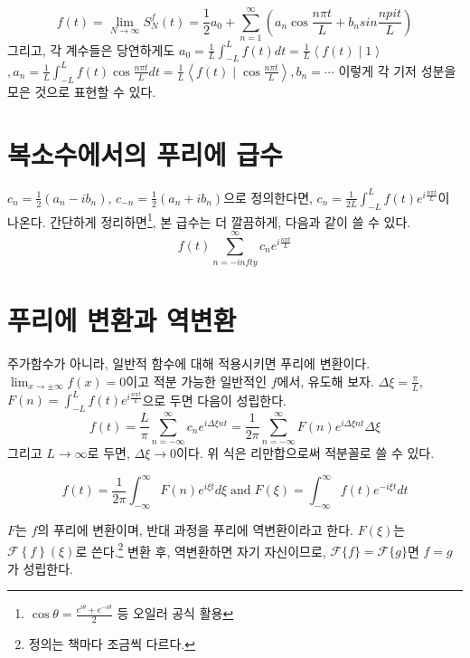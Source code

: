 \documentclass[article, oneside]{oblivoir}
\begin{document}
\begin{equation}
    f(t) = \lim_{N \to \infty} S_N^f (t) = \frac{1}{2} a_0 + \sum_{n=1}^{\infty} \left( a_n \cos \frac{n \pi t}{L} + b_n sin \frac{n pi t}{L}\right)
\end{equation}
그리고, 각 계수들은 당연하게도
$a_0 = \frac{1}{L} \int_{-L}^{L} f(t)dt
= \frac{1}{L} \left\langle f(t) \mid 1\right\rangle$$
, a_n = \frac{1}{L} \int_{-L}^{L} f(t) \cos\frac{n \pi t}{L}dt 
=\frac{1}{L} \left\langle f(t) \mid \cos\frac{n \pi t}{L}\right\rangle, b_n = \cdots$ 이렇게 각 기저 성분을 모은 것으로 표현할 수 있다.

\section{복소수에서의 푸리에 급수}
$c_n = \frac{1}{2}\left(a_n - ib_n\right)$, $c_{-n} = \frac{1}{2}\left(a_n + ib_n\right)$으로 정의한다면, $c_n = \frac{1}{2L}\int_{-L}^{L} f(t)e^{i\frac{n \pi t}{L}}$이 나온다. 간단하게 정리하면\footnote{$\cos \theta = \frac{e^{i \theta} + e^{-i \theta}}{2}$ 등 오일러 공식 활용}, 본 급수는 더 깔끔하게, 다음과 같이 쓸 수 있다.
\begin{equation}
    f(t) \sum_{n=-infty}^{\infty} c_n e^{i \frac{n \pi t}{L}}
\end{equation}

\section{푸리에 변환과 역변환}

주가함수가 아니라, 일반적 함수에 대해 적용시키면 푸리에 변환이다. $\lim_{x \to \pm \infty}f(x)=0$이고 적분 가능한 일반적인 $f$에서, 유도해 보자.
$\Delta \xi = \frac{\pi}{L}$, $F(n) = \int_{-L}^{L} f(t)e^{i\frac{n \pi t}{L}}$으로 두면 다음이 성립한다. 
$$f(t) = \frac{L}{\pi} \sum_{n=-\infty}^{\infty} c_n e^{i \Delta \xi n t} = \frac{1}{2\pi} \sum_{n=-\infty}^{\infty} F(n) e^{i  \Delta \xi n t} \Delta \xi$$
그리고 $L \to \infty$로 두면, $\Delta \xi \to 0$이다. 위 식은 리만합으로써 적분꼴로 쓸 수 있다.

\begin{equation}
    f(t) = \frac{1}{2\pi} \int_{-\infty}^{\infty} F(n) e^{i \xi t}d\xi \;\text{and}\; F(\xi) = \int_{-\infty}^{\infty} f(t)e^{-i \xi t}dt
\end{equation}

$F$는 $f$의 푸리에 변환이며, 반대 과정을 푸리에 역변환이라고 한다. $F(\xi)$는 $\mathcal{F}\left\{f\right\}(\xi)$로 쓴다.\footnote{정의는 책마다 조금씩 다르다.} 변환 후, 역변환하면 자기 자신이므로, $\mathcal{F}\{f\} = \mathcal{F}\{g\}$면 $f=g$가 성립한다.
\end{document}
